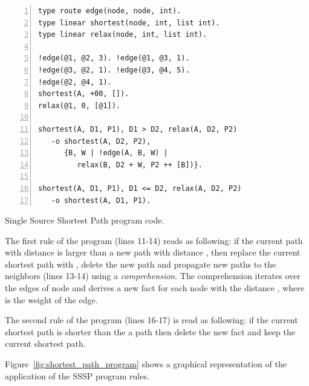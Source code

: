 \begin{topfig}
\scriptsize\begin{Verbatim}[numbers=left]
type route edge(node, node, int).
type linear shortest(node, int, list int).
type linear relax(node, int, list int).

!edge(@1, @2, 3). !edge(@1, @3, 1).
!edge(@3, @2, 1). !edge(@3, @4, 5).
!edge(@2, @4, 1).
shortest(A, +00, []).
relax(@1, 0, [@1]).

shortest(A, D1, P1), D1 > D2, relax(A, D2, P2)
   -o shortest(A, D2, P2),
      {B, W | !edge(A, B, W) |
         relax(B, D2 + W, P2 ++ [B])}.

shortest(A, D1, P1), D1 <= D2, relax(A, D2, P2)
   -o shortest(A, D1, P1).
\end{Verbatim}
\caption{Single Source Shortest Path program code.}
\label{code:shortest_path_program}
\end{topfig}

The first rule of the program (lines 11-14) reads as following: if the current
 path  with distance  is larger
than a new path  with distance , then replace the
current shortest path with , delete the new  path and
propagate new paths to the neighbors (lines 13-14) using a \emph{comprehension}.
The comprehension iterates over the edges of node  and derives a new
 fact for each node  with the distance ,
where  is the weight of the edge.

The second rule of the program (lines 16-17) is read as following: if the
current shortest path  is shorter than the a path  then
delete the new  fact and keep the current shortest path.

Figure~\ref{fig:shortest_path_program} shows a graphical representation of the
application of the SSSP program rules.

